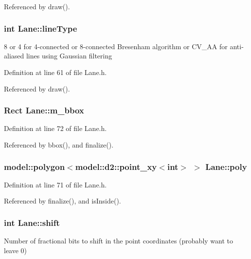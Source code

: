 \-Referenced by draw().

\hypertarget{class_lane_a3739821c9f0ac97c302dd05af44d58fd}{
\subsubsection[{line\-Type}]{\setlength{\rightskip}{0pt plus 5cm}int {\bf \-Lane\-::line\-Type}}}
\label{class_lane_a3739821c9f0ac97c302dd05af44d58fd}
8 or 4 for 4-\/connected or 8-\/connected \-Bresenham algorithm or \-C\-V\-\_\-\-A\-A for anti-\/aliased lines using \-Gaussian filtering 

\-Definition at line 61 of file \-Lane.\-h.



\-Referenced by draw().

\hypertarget{class_lane_a00ae117899030b8d079edb4aba92f86c}{
\subsubsection[{m\-\_\-bbox}]{\setlength{\rightskip}{0pt plus 5cm}\-Rect {\bf \-Lane\-::m\-\_\-bbox}}}
\label{class_lane_a00ae117899030b8d079edb4aba92f86c}


\-Definition at line 72 of file \-Lane.\-h.



\-Referenced by bbox(), and finalize().

\hypertarget{class_lane_a8e0f8b6ff11437a3b16f8e030d1ea271}{
\subsubsection[{poly}]{\setlength{\rightskip}{0pt plus 5cm}model\-::polygon$<$model\-::d2\-::point\-\_\-xy$<$int$>$ $>$ {\bf \-Lane\-::poly}}}
\label{class_lane_a8e0f8b6ff11437a3b16f8e030d1ea271}


\-Definition at line 71 of file \-Lane.\-h.



\-Referenced by finalize(), and is\-Inside().

\hypertarget{class_lane_afd053ab5133d132146bef9f3c7afe92e}{
\subsubsection[{shift}]{\setlength{\rightskip}{0pt plus 5cm}int {\bf \-Lane\-::shift}}}
\label{class_lane_afd053ab5133d132146bef9f3c7afe92e}
\-Number of fractional bits to shift in the point coordinates (probably want to leave 0) 


